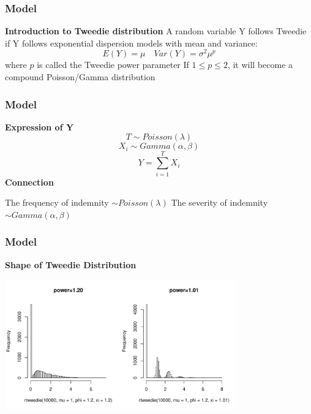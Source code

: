\documentclass[serif,10pt,aspectratio=169]{beamer}
\begin{document}
\begin{frame}
\frametitle{Model}
\textbf{Introduction to Tweedie distribution}
\newline
\newline
\newline A random variable Y follows Tweedie if Y follows exponential dispersion models with mean and variance:
\begin{equation*}
	E(Y)=\mu \quad Var(Y)=\sigma^2\mu^{p}
\end{equation*}
\newline
where $p$ is called the Tweedie power parameter
\newline
\newline If $1 \leq p \leq 2 $, it will become a compound Poisson/Gamma distribution

\end{frame}


\begin{frame}
\frametitle{Model}
\textbf{Expression of Y}
\begin{equation*}
T \sim Poisson(\lambda)
\end{equation*}
\begin{equation*}
X_i \sim Gamma(\alpha,\beta)
\end{equation*}
\begin{equation*}
Y =\sum_{i=1}^{T}X_i
\end{equation*}
\textbf{Connection}

\newline The frequency of indemnity $\sim Poisson(\lambda)$
\newline The severity of indemnity $\sim Gamma(\alpha,\beta)$
\end{frame}


\begin{frame}
\frametitle{Model}
\textbf{Shape of Tweedie Distribution}
\begin{center}
\includegraphics[width=10cm]{imgFinal/Tweedie.pdf}
\end{center}
\end{frame}
\end{document}
